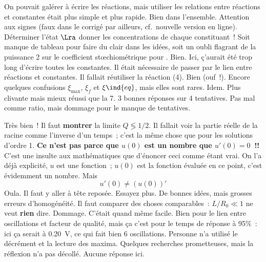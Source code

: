 \documentclass[a4paper, 10pt, final, garamond]{book}
\begin{document}
\begin{enumerate}
	On pouvait galérer à écrire les réactions, mais utiliser les
	relations entre réactions et constantes était plus simple et plus rapide.
	Bien dans l'ensemble. Attention aux signes (faux dans le corrigé
	par ailleurs, cf.\ nouvelle version en ligne). Déterminer l'état $\Lra$ donner
	les concentrations de chaque constituant~!
	Soit manque de tableau pour faire du clair dans les idées, soit un
	oubli flagrant de la puissance 2 sur le coefficient stœchiométrique pour
	.
	Bien.
	Ici, ç'aurait été trop long d'écrire toutes les constantes. Il était
	nécessaire de passer par le lien entre réactions et constantes. Il fallait
	réutiliser la réaction (4).
	Bien (ouf~!).
	Encore quelques confusions $\xi_{\max}$, $\xi_f$ et $\xi\ind{eq}$,
	mais elles sont rares.
	Idem. Plus clivante mais mieux réussi que la 7.
	3 bonnes réponses sur 4 tentatives. Pas mal comme ratio, mais
	dommage pour le manque de tentatives.
\end{enumerate}

\setcounter{section}{0}
\begin{enumerate}
	Très bien~!
	Il faut \textbf{montrer} la limite $Q \lessgtr 1/2$.
	Il fallait voir la partie réelle de la racine comme l'inverse d'un
	temps~; c'est la même chose que pour les solutions d'ordre 1.
	\textbf{Ce n'est pas parce que $u(0)$ est un nombre que $u'(0) =
			0$~!!} C'est une {\Huge insulte aux mathématiques} que d'énoncer ceci
	comme étant vrai. On l'a déjà explicité, $u$ est une fonction~; $u(0)$
	est la fonction évaluée en ce point, c'est évidemment un nombre. Mais
		{\Large
			\[
				\boxed{u'(0) \neq (u(0))'}
			\]
		}
	Oula. Il faut y aller à tête reposée. Essayez plus.
	De bonnes idées, mais grosses erreurs d'homogénéité. Il faut
	comparer des choses comparables~: $L/R_0 \ll 1$ ne veut \textbf{rien} dire.
	Dommage.
	C'était quand même facile.
	Bien pour le lien entre oscillations et facteur de qualité, mais ça
	c'est pour le temps de réponse à 95\%~: ici ça serait à \SI{0.20}{V}, ce qui
	fait bien 6 oscillations. Personne n'a utilisé le décrément et la lecture des
	maxima.
	Quelques recherches prometteuses, mais la réflexion n'a pas décollé.
	Aucune réponse ici.
\end{enumerate}
\end{document}
